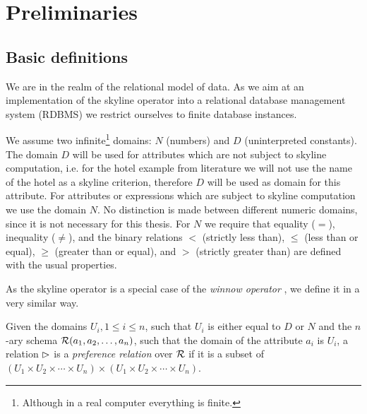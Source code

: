 \chapter{Preliminaries}
\label{chap:preliminaries}

\section{Basic definitions}


We are in the realm of the relational model of
data.  As we aim at an implementation of the skyline operator into a
relational database management system (RDBMS) we restrict ourselves
to finite database instances.

We assume two infinite\footnote{Although in a real computer 
everything is finite.} domains: $N$ (numbers) and $D$ (uninterpreted
constants). The domain $D$ will be used for attributes which are not
subject to skyline computation, i.e. for the hotel example from literature we
will not use the name of the hotel as a skyline criterion, therefore
$D$ will be used as domain for this attribute.  For attributes or
expressions which are subject to skyline computation we use the domain
$N$. No distinction is made between different numeric domains, since
it is not necessary for this thesis. For $N$ we require that equality
($=$), inequality ($\not=$), and the binary relations $<$ (strictly
less than), $\le$ (less than or equal), $\ge$ (greater than or equal),
and $>$ (strictly greater than) are defined with the usual properties.

As the skyline operator is a special case of the \emph{winnow
operator} \citep{Chomicki2003a}, we define it in a very similar way.

\begin{definition}
Given the domains $U_i, 1 \le i \le n$, such that $U_i$ is either
equal to $D$ or $N$ and the $n$-ary schema $\mathcal{R}(a_1, a_2, \ldots,
a_n)$, such that the domain of the attribute $a_i$ is $U_i$, 
a relation $\vartriangleright$ is a \emph{preference relation} over
$\mathcal{R}$ if it is a subset of $(U_1 \times U_2 \times \cdots \times U_n) \times 
(U_1 \times U_2 \times \cdots \times U_n)$.
\end{definition}

